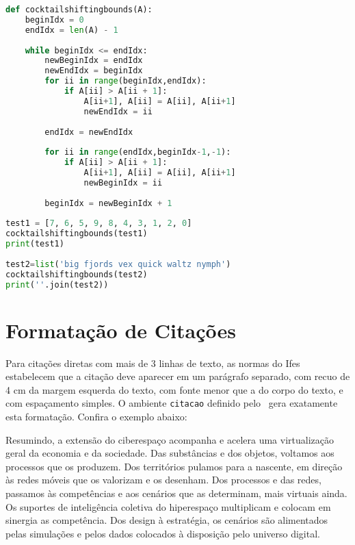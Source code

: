\documentclass[times,english,brazil,oneside,section=TITLE]{ifes8}
\begin{document}
\begin{lstlisting}[language=Python,float,label=lst:cocktailsort,caption={Algoritmo de
ordenação \emph{Cocktail sort} com limites deslocáveis.}]
def cocktailshiftingbounds(A):
    beginIdx = 0
    endIdx = len(A) - 1
 
    while beginIdx <= endIdx:
        newBeginIdx = endIdx
        newEndIdx = beginIdx
        for ii in range(beginIdx,endIdx):
            if A[ii] > A[ii + 1]:
                A[ii+1], A[ii] = A[ii], A[ii+1]
                newEndIdx = ii
 
        endIdx = newEndIdx
 
        for ii in range(endIdx,beginIdx-1,-1):
            if A[ii] > A[ii + 1]:
                A[ii+1], A[ii] = A[ii], A[ii+1]
                newBeginIdx = ii
 
        beginIdx = newBeginIdx + 1
 
test1 = [7, 6, 5, 9, 8, 4, 3, 1, 2, 0]
cocktailshiftingbounds(test1)
print(test1)
 
test2=list('big fjords vex quick waltz nymph')
cocktailshiftingbounds(test2)
print(''.join(test2))
\end{lstlisting}

\section{Formatação de Citações}
\label{sec:format-citac}

Para citações diretas com mais de 3 linhas de texto, as normas do Ifes
estabelecem que a citação deve aparecer em um parágrafo separado, com
recuo de 4 cm da margem esquerda do texto, com fonte menor que a do
corpo do texto, e com espaçamento simples. O ambiente \texttt{citacao}
definido pelo \abnTeX\ gera exatamente esta formatação. Confira o
exemplo abaixo:

\begin{citacao}
  Resumindo, a extensão do ciberespaço acompanha e acelera uma
  virtualização geral da economia e da sociedade. Das substâncias e
  dos objetos, voltamos aos processos que os produzem. Dos territórios
  pulamos para a nascente, em direção às redes móveis que os valorizam
  e os desenham. Dos processos e das redes, passamos às competências e
  aos cenários que as determinam, mais virtuais ainda. Os suportes de
  inteligência coletiva do hiperespaço multiplicam e colocam em
  sinergia as competência. Dos design à estratégia, os cenários são
  alimentados pelas simulações e pelos dados colocados à disposição
  pelo universo digital. \cite{Levy1999}
\end{citacao}
\end{document}
